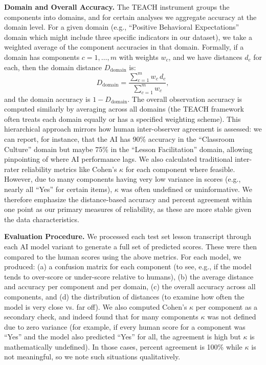 \documentclass[12pt]{article}
\begin{document}
\textbf{Domain and Overall Accuracy.} The TEACH instrument groups the components into domains, and for certain analyses we aggregate accuracy at the domain level. For a given domain (e.g., “Positive Behavioral Expectations” domain which might include three specific indicators in our dataset), we take a weighted average of the component accuracies in that domain. Formally, if a domain has components \(c = 1,\dots,m\) with weights \(w_c\), and we have distances \(d_c\) for each, then the domain distance \(D_{\text{domain}}\) is:
\[
D_{\text{domain}} = \frac{\sum_{c=1}^{m} w_c \, d_c}{\sum_{c=1}^{m} w_c},
\]
and the domain accuracy is \(1 - D_{\text{domain}}\). The overall observation accuracy is computed similarly by averaging across all domains (the TEACH framework often treats each domain equally or has a specified weighting scheme). This hierarchical approach mirrors how human inter-observer agreement is assessed: we can report, for instance, that the AI has 90\% accuracy in the “Classroom Culture” domain but maybe 75\% in the “Lesson Facilitation” domain, allowing pinpointing of where AI performance lags. We also calculated traditional inter-rater reliability metrics like Cohen’s \(\kappa\) for each component where feasible. However, due to many components having very low variance in scores (e.g., nearly all “Yes” for certain items), \(\kappa\) was often undefined or uninformative. We therefore emphasize the distance-based accuracy and percent agreement within one point as our primary measures of reliability, as these are more stable given the data characteristics.

\textbf{Evaluation Procedure.} We processed each test set lesson transcript through each AI model variant to generate a full set of predicted scores. These were then compared to the human scores using the above metrics. For each model, we produced: (a) a confusion matrix for each component (to see, e.g., if the model tends to over-score or under-score relative to humans), (b) the average distance and accuracy per component and per domain, (c) the overall accuracy across all components, and (d) the distribution of distances (to examine how often the model is very close vs. far off). We also computed Cohen’s \(\kappa\) per component as a secondary check, and indeed found that for many components \(\kappa\) was not defined due to zero variance (for example, if every human score for a component was “Yes” and the model also predicted “Yes” for all, the agreement is high but \(\kappa\) is mathematically undefined). In those cases, percent agreement is 100\% while \(\kappa\) is not meaningful, so we note such situations qualitatively.
\end{document}
